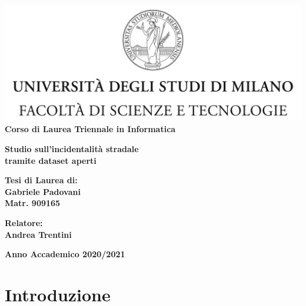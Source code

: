 \documentclass[a4paper,12pt]{report}
\begin{document}
\begin{titlepage}
\begin{center}
\includegraphics[width=\textwidth]{Logo.jpg}\\
{\large{\bf Corso di Laurea Triennale in Informatica}}
\end{center}
\vspace{12mm}
\begin{center}
{\huge{\bf Studio sull'incidentalità stradale}}\\
\vspace{4mm}
{\huge{\bf tramite dataset aperti}}\\
\end{center}
\vspace{12mm}
\begin{flushright}
{\large{\bf Tesi di Laurea di:}}\\
{\large{\bf Gabriele Padovani}}\\
{\large{\bf Matr. 909165}}\\
\end{flushright}
\vspace{4mm}
\begin{flushleft}
{\large{\bf Relatore:}}\\
{\large{\bf Andrea Trentini}}\\
\end{flushleft}
\vspace{12mm}
\begin{center}
{\large{\bf Anno Accademico 2020/2021}}
\end{center}
\end{titlepage}

\tableofcontents

\listoftodos

\chapter{Introduzione}
\end{document}
